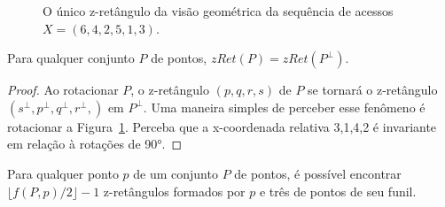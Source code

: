 \begin{figure}
    \caption{O único z-retângulo da visão geométrica da sequência de acessos $X = (6,4,2,5,1,3)$.}
\label{fig:z-retangulo-isolado}
\end{figure}

\begin{lemma}\label{lemma:p-inversivel}
    Para qualquer conjunto $P$ de pontos, $zRet(P) = zRet(P^{\perp})$.
\end{lemma}

\begin{proof}
    Ao rotacionar $P$, o z-retângulo $(p,q,r,s)$ de $P$ se tornará o z-retângulo $(s^{\perp},p^{\perp},q^{\perp},r^{\perp},)$ em $P^{\perp}$. Uma maneira simples de perceber esse fenômeno é rotacionar a Figura~\ref{fig:z-retangulo-isolado}. Perceba que a x-coordenada relativa 3,1,4,2 é invariante em relação à rotações de 90°.
\end{proof}

\begin{lemma}
    Para qualquer ponto $p$ de um conjunto $P$ de pontos, é possível encontrar $\lfloor f(P,p)/2 \rfloor - 1$ z-retângulos formados por $p$ e três de pontos de seu funil.
\end{lemma}

